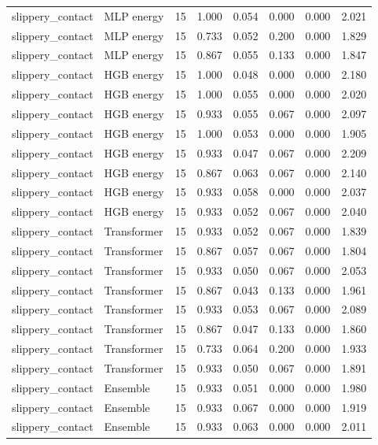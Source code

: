 {\begin{longtable}{llrrrrrr}
slippery\_contact & MLP energy & 15 & 1.000 & 0.054 & 0.000 & 0.000 & 2.021 \\
slippery\_contact & MLP energy & 15 & 0.733 & 0.052 & 0.200 & 0.000 & 1.829 \\
slippery\_contact & MLP energy & 15 & 0.867 & 0.055 & 0.133 & 0.000 & 1.847 \\
slippery\_contact & HGB energy & 15 & 1.000 & 0.048 & 0.000 & 0.000 & 2.180 \\
slippery\_contact & HGB energy & 15 & 1.000 & 0.055 & 0.000 & 0.000 & 2.020 \\
slippery\_contact & HGB energy & 15 & 0.933 & 0.055 & 0.067 & 0.000 & 2.097 \\
slippery\_contact & HGB energy & 15 & 1.000 & 0.053 & 0.000 & 0.000 & 1.905 \\
slippery\_contact & HGB energy & 15 & 0.933 & 0.047 & 0.067 & 0.000 & 2.209 \\
slippery\_contact & HGB energy & 15 & 0.867 & 0.063 & 0.067 & 0.000 & 2.140 \\
slippery\_contact & HGB energy & 15 & 0.933 & 0.058 & 0.000 & 0.000 & 2.037 \\
slippery\_contact & HGB energy & 15 & 0.933 & 0.052 & 0.067 & 0.000 & 2.040 \\
slippery\_contact & Transformer & 15 & 0.933 & 0.052 & 0.067 & 0.000 & 1.839 \\
slippery\_contact & Transformer & 15 & 0.867 & 0.057 & 0.067 & 0.000 & 1.804 \\
slippery\_contact & Transformer & 15 & 0.933 & 0.050 & 0.067 & 0.000 & 2.053 \\
slippery\_contact & Transformer & 15 & 0.867 & 0.043 & 0.133 & 0.000 & 1.961 \\
slippery\_contact & Transformer & 15 & 0.933 & 0.053 & 0.067 & 0.000 & 2.089 \\
slippery\_contact & Transformer & 15 & 0.867 & 0.047 & 0.133 & 0.000 & 1.860 \\
slippery\_contact & Transformer & 15 & 0.733 & 0.064 & 0.200 & 0.000 & 1.933 \\
slippery\_contact & Transformer & 15 & 0.933 & 0.050 & 0.067 & 0.000 & 1.891 \\
slippery\_contact & Ensemble & 15 & 0.933 & 0.051 & 0.000 & 0.000 & 1.980 \\
slippery\_contact & Ensemble & 15 & 0.933 & 0.067 & 0.000 & 0.000 & 1.919 \\
slippery\_contact & Ensemble & 15 & 0.933 & 0.063 & 0.000 & 0.000 & 2.011 \\

\end{longtable}}
